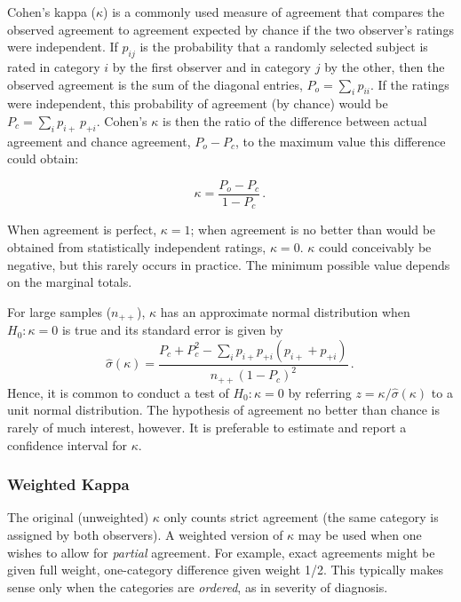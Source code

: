 \documentclass[11pt]{book}\usepackage[]{graphicx}\usepackage[]{color}
\begin{document}
Cohen's kappa (\(\kappa\))
\citep{Cohen:60,Cohen:68} is a commonly used measure of agreement that
compares the observed agreement to agreement expected by chance if the two observer's
ratings were independent.
If $p_{ij}$ is the probability that a randomly selected subject is
rated in category $i$ by the first observer and in category $j$ by
the other, then the observed agreement is the sum of the diagonal
entries,  \(P_o  = \sum_i p_{ii}\).  If the ratings were independent,
this probability of agreement (by chance) would be \(P_c = \sum_i p_{i+} \,  p_{+i}\).
Cohen's $\kappa$ is then the ratio of the difference between actual
agreement and chance agreement, $P_o - P_c$, to the maximum value
this difference could obtain:

\begin{equation}\label{eq:kappa}
  \kappa =  \frac{ P_o - P_c } { 1 - P_c }
  \period
\end{equation}

When agreement is perfect, \(\kappa = 1\);  when agreement is no
better than would be obtained from statistically independent ratings,
$\kappa = 0$.
$\kappa$ could conceivably be negative, but this rarely occurs in practice.
The minimum possible value depends on the marginal totals.

For large samples ($n_{++}$), $\kappa$ has an approximate normal
distribution when $H_0 : \kappa = 0$ is true
and its standard error \citep{Fleiss:73,Fleiss-etal:69} is given by
\begin{equation*}
 \hat{\sigma}(\kappa) =  \frac{ P_c + P_c^2 - \sum_i p_{i+} p_{+i} (p_{i+} + p_{+i}) } { n_{++} (1 - P_c)^2 }
 \period
\end{equation*}
Hence, it is common to conduct a test of $H_0 : \kappa = 0$ by
referring $z = \kappa / \hat{\sigma}(\kappa)$
to a unit normal distribution.
The hypothesis of agreement no better than chance is rarely of much
interest, however.  It is preferable to estimate and report a
confidence interval for $\kappa$.

\subsubsection{Weighted Kappa}
The original (unweighted) \(\kappa\) only counts strict agreement (the same
category is assigned by both observers).  A weighted version of
\(\kappa\)
\citep{Cohen:68} may be used when one wishes to allow for \emph{partial} agreement.
For example, exact agreements might be given full weight,
one-category difference given weight 1/2.  This typically makes sense
only when the categories are \emph{ordered}, as in severity of
diagnosis.
\end{document}
